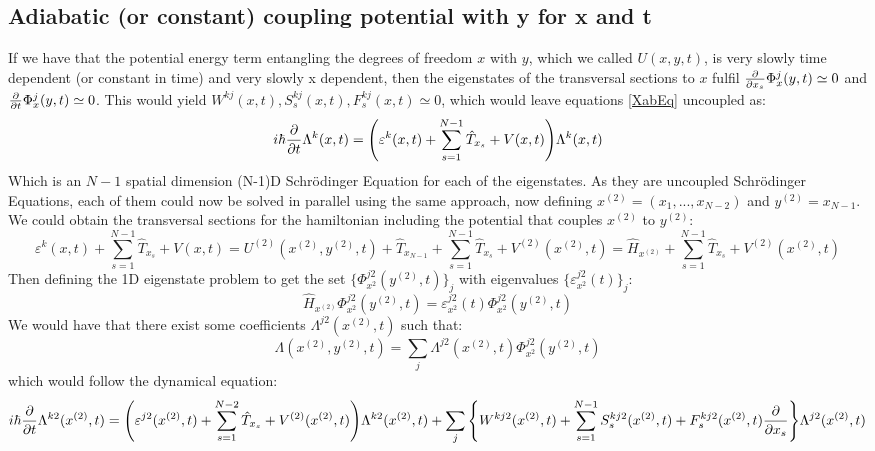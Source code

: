 \documentclass[11pt, a4paper]{article} %
\begin{document}
\subsection{Adiabatic (or constant) coupling potential with y for x and t}
If we have that the potential energy term entangling the degrees of freedom $x$ with $y$, which we called $U(x,y,t)$, is very slowly time dependent (or constant in time) and very slowly x dependent, then the eigenstates of the transversal sections to $x$ fulfil $\pdv{}{x_s}\Phi^j_x(y,t)\simeq 0$ and $\pdv{}{t}\Phi^j_x(y,t)\simeq 0$. This would yield $W^{kj}(x,t),S^{kj}_s(x,t),F^{kj}_s(x,t)\simeq 0$, which would leave equations \eqref{XabEq} uncoupled as:
\begin{equation}\label{startInception}
i\hbar \pdv{}{t}\Lambda^k(x,t) = \qty( \varepsilon^k(x,t) + \sum_{s=1}^{N-1}\hat{T}_{x_s} +V(x,t))\Lambda^k(x,t)
\end{equation}
Which is an $N-1$ spatial dimension (N-1)D Schrödinger Equation for each of the eigenstates. As they are uncoupled Schrödinger Equations, each of them could now be solved in parallel using the same approach, now defining $x^{(2)}=(x_1,...,x_{N-2})$ and $y^{(2)}=x_{N-1}$. We could obtain the transversal sections for the hamiltonian including the potential that couples $x^{(2)}$ to $y^{(2)}$:
\begin{equation}
\varepsilon^k(x,t) + \sum_{s=1}^{N-1}\hat{T}_{x_s} +V(x,t)= U^{(2)}(x^{(2)}, y^{(2)},t)+ \hat{T}_{x_{N-1}} + \sum_{s=1}^{N-1}\hat{T}_{x_s}+V^{(2)}(x^{(2)},t)=\hat{H}_{x^{(2)}}+ \sum_{s=1}^{N-1}\hat{T}_{x_s}+V^{(2)}(x^{(2)},t)
\end{equation}
Then defining the 1D eigenstate problem to get the set $\{\Phi^{j2}_{x^{2}}(y^{(2)},t)\}_j$ with eigenvalues $\{\varepsilon^{j2}_{x^{2}} (t)\}_j$:
\begin{equation}
\hat{H}_{x^{(2)}}\Phi^{j2}_{x^{2}}(y^{(2)},t) = \varepsilon^{j2}_{x^{2}} (t) \Phi^{j2}_{x^{2}}(y^{(2)},t)
\end{equation}
We would have that there exist some coefficients $\Lambda^{j2}(x^{(2)},t)$ such that:
\begin{equation}
\Lambda(x^{(2)},y^{(2)},t)=\sum_j \Lambda^{j2}(x^{(2)},t) \Phi^{j2}_{x^{2}}(y^{(2)},t)
\end{equation}
which would follow the dynamical equation:
\begin{equation}
i\hbar \pdv{}{t}\Lambda^{k2}(x^{(2)},t)  = \qty( \varepsilon^{j2}(x^{(2)},t) + \sum_{s=1}^{N-2}\hat{T}_{x_s} +V^{(2)}(x^{(2)},t))\Lambda^{k2}(x^{(2)},t)+\sum_j \qty{ W^{kj2}(x^{(2)},t) + \sum_{s=1}^{N-1} S^{kj2}_s(x^{(2)},t)+F^{kj2}_s(x^{(2)},t)\pdv{}{x_s} } \Lambda^{j2}(x^{(2)},t) 
\end{equation}
\end{document}
